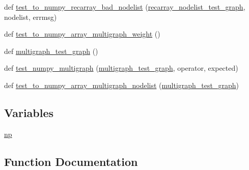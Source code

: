 \begin{DoxyCompactItemize}
\item 
def \hyperlink{namespacenetworkx_1_1tests_1_1test__convert__numpy_ae31f105d37a6195d29b72cf0b3703d58}{test\+\_\+to\+\_\+numpy\+\_\+recarray\+\_\+bad\+\_\+nodelist} (\hyperlink{namespacenetworkx_1_1tests_1_1test__convert__numpy_ad40ef5d5fb6b2aba483745b500f62251}{recarray\+\_\+nodelist\+\_\+test\+\_\+graph}, nodelist, errmsg)
\item 
def \hyperlink{namespacenetworkx_1_1tests_1_1test__convert__numpy_aa62437f5304c2e20d7872fe367a4f604}{test\+\_\+to\+\_\+numpy\+\_\+array\+\_\+multigraph\+\_\+weight} ()
\item 
def \hyperlink{namespacenetworkx_1_1tests_1_1test__convert__numpy_acdd241b119cb5243db9d7026986d6bf5}{multigraph\+\_\+test\+\_\+graph} ()
\item 
def \hyperlink{namespacenetworkx_1_1tests_1_1test__convert__numpy_ab31423882d7755f6e7971052c6ce2aa7}{test\+\_\+numpy\+\_\+multigraph} (\hyperlink{namespacenetworkx_1_1tests_1_1test__convert__numpy_acdd241b119cb5243db9d7026986d6bf5}{multigraph\+\_\+test\+\_\+graph}, operator, expected)
\item 
def \hyperlink{namespacenetworkx_1_1tests_1_1test__convert__numpy_a0e298da638748979de79fb3ba3a3a1d1}{test\+\_\+to\+\_\+numpy\+\_\+array\+\_\+multigraph\+\_\+nodelist} (\hyperlink{namespacenetworkx_1_1tests_1_1test__convert__numpy_acdd241b119cb5243db9d7026986d6bf5}{multigraph\+\_\+test\+\_\+graph})
\end{DoxyCompactItemize}
\subsection*{Variables}
\begin{DoxyCompactItemize}
\item 
\hyperlink{namespacenetworkx_1_1tests_1_1test__convert__numpy_ae5f8efa45552eabf622ded35875d59be}{np}
\end{DoxyCompactItemize}


\subsection{Function Documentation}
\mbox{\label{namespacenetworkx_1_1tests_1_1test__convert__numpy_acdd241b119cb5243db9d7026986d6bf5}} 
